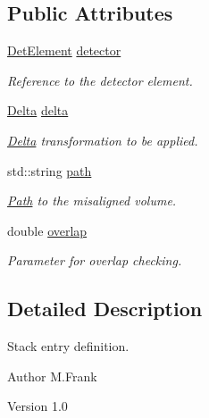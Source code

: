 \subsection*{Public Attributes}
\begin{DoxyCompactItemize}
\item 
\hyperlink{namespace_d_d4hep_a21dd977310ff183f61ca6ae14b59a989}{DetElement} \hyperlink{struct_d_d4hep_1_1_alignments_1_1_alignment_stack_1_1_stack_entry_aa74274273fd1aad6e46c77e9983b8e5c}{detector}
\begin{DoxyCompactList}\small\item\em Reference to the detector element. \item\end{DoxyCompactList}\item 
\hyperlink{class_d_d4hep_1_1_alignments_1_1_delta}{Delta} \hyperlink{struct_d_d4hep_1_1_alignments_1_1_alignment_stack_1_1_stack_entry_a4ef9eea2ab457bd908d8050f5a5d553e}{delta}
\begin{DoxyCompactList}\small\item\em \hyperlink{class_d_d4hep_1_1_alignments_1_1_delta}{Delta} transformation to be applied. \item\end{DoxyCompactList}\item 
std::string \hyperlink{struct_d_d4hep_1_1_alignments_1_1_alignment_stack_1_1_stack_entry_a821c8882427c693062524b6573baa92c}{path}
\begin{DoxyCompactList}\small\item\em \hyperlink{class_d_d4hep_1_1_path}{Path} to the misaligned volume. \item\end{DoxyCompactList}\item 
double \hyperlink{struct_d_d4hep_1_1_alignments_1_1_alignment_stack_1_1_stack_entry_ad911a7daa4d606e7c8454b005064b4e9}{overlap}
\begin{DoxyCompactList}\small\item\em Parameter for overlap checking. \item\end{DoxyCompactList}\end{DoxyCompactItemize}


\subsection{Detailed Description}
Stack entry definition. \begin{DoxyAuthor}{Author}
M.Frank 
\end{DoxyAuthor}
\begin{DoxyVersion}{Version}
1.0 
\end{DoxyVersion}


